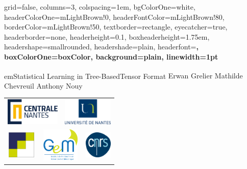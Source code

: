 \documentclass[portrait,a0paper]{baposter}
\begin{document}
\begin{poster}%
{
	grid=false,
	columns=3,
	colspacing=1em,
	bgColorOne=white,
	headerColorOne=mLightBrown!0,
	headerFontColor=mLightBrown!80,
	borderColor=mLightBrown!50,
	textborder=rectangle,
	eyecatcher=true,
	headerborder=none,
	headerheight=0.1\textheight,
	boxheaderheight=1.75em,
	headershape=smallrounded,
	headershade=plain,
	headerfont=\large\bfseries, %
	boxColorOne=boxColor,
	background=plain,
	linewidth=1pt
}
{

}
{ em\relax Statistical Learning in Tree-Based\linebreak Tensor Format\vspace{0.5em}}
{\hfill {Erwan Grelier}\textsuperscript{\dag} \hfill {Mathilde Chevreuil} \hfill {Anthony Nouy} \hfill \vphantom{A} \vspace{-5mm}}
{
	\begin{tabular}{cccccc}
		\\[7mm]
		\multicolumn{3}{c}{\includegraphics[align=c,height=1.3cm]{./doc/logo_centrale.eps}} &
		\multicolumn{3}{c}{\includegraphics[align=c,height=1.3cm]{./doc/logo_univ.eps}} \\[.6cm]
		\multicolumn{2}{c}{\includegraphics[align=c,height=1.3cm]{./doc/logo_lmjl.pdf}} &
		\multicolumn{2}{c}{\includegraphics[align=c,height=1.6cm]{./doc/logo_GeM.eps}} &
		\multicolumn{2}{c}{\includegraphics[align=c,height=1.3cm]{./doc/logo_CNRS.eps}}
	\end{tabular}
}


\end{poster}
\end{document}
